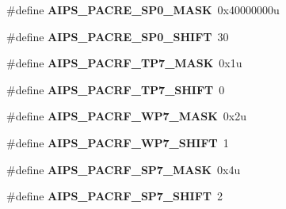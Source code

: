 \begin{DoxyCompactItemize}
\item 
\hypertarget{group___a_i_p_s___register___masks_gad466232930d5e4ed228f96fc26ead8c2}{}\#define {\bfseries A\+I\+P\+S\+\_\+\+P\+A\+C\+R\+E\+\_\+\+S\+P0\+\_\+\+M\+A\+S\+K}~0x40000000u\label{group___a_i_p_s___register___masks_gad466232930d5e4ed228f96fc26ead8c2}

\item 
\hypertarget{group___a_i_p_s___register___masks_ga47620f45a33c83729ba42d5cb7a96cd3}{}\#define {\bfseries A\+I\+P\+S\+\_\+\+P\+A\+C\+R\+E\+\_\+\+S\+P0\+\_\+\+S\+H\+I\+F\+T}~30\label{group___a_i_p_s___register___masks_ga47620f45a33c83729ba42d5cb7a96cd3}

\item 
\hypertarget{group___a_i_p_s___register___masks_ga9e5031cf93ccc20f6c807c7779884558}{}\#define {\bfseries A\+I\+P\+S\+\_\+\+P\+A\+C\+R\+F\+\_\+\+T\+P7\+\_\+\+M\+A\+S\+K}~0x1u\label{group___a_i_p_s___register___masks_ga9e5031cf93ccc20f6c807c7779884558}

\item 
\hypertarget{group___a_i_p_s___register___masks_gaf22d62e3a6d2920c5da05ba192828996}{}\#define {\bfseries A\+I\+P\+S\+\_\+\+P\+A\+C\+R\+F\+\_\+\+T\+P7\+\_\+\+S\+H\+I\+F\+T}~0\label{group___a_i_p_s___register___masks_gaf22d62e3a6d2920c5da05ba192828996}

\item 
\hypertarget{group___a_i_p_s___register___masks_ga6e87c0a628a47aed3cb92a0f589b291c}{}\#define {\bfseries A\+I\+P\+S\+\_\+\+P\+A\+C\+R\+F\+\_\+\+W\+P7\+\_\+\+M\+A\+S\+K}~0x2u\label{group___a_i_p_s___register___masks_ga6e87c0a628a47aed3cb92a0f589b291c}

\item 
\hypertarget{group___a_i_p_s___register___masks_gae53f33c892c6fe1d11ab9228298a1615}{}\#define {\bfseries A\+I\+P\+S\+\_\+\+P\+A\+C\+R\+F\+\_\+\+W\+P7\+\_\+\+S\+H\+I\+F\+T}~1\label{group___a_i_p_s___register___masks_gae53f33c892c6fe1d11ab9228298a1615}

\item 
\hypertarget{group___a_i_p_s___register___masks_gaa7e8e5b0b780abcb2a9690a9cec22364}{}\#define {\bfseries A\+I\+P\+S\+\_\+\+P\+A\+C\+R\+F\+\_\+\+S\+P7\+\_\+\+M\+A\+S\+K}~0x4u\label{group___a_i_p_s___register___masks_gaa7e8e5b0b780abcb2a9690a9cec22364}

\item 
\hypertarget{group___a_i_p_s___register___masks_ga4bb28a8a6a6faad442d6389a10ea3ca1}{}\#define {\bfseries A\+I\+P\+S\+\_\+\+P\+A\+C\+R\+F\+\_\+\+S\+P7\+\_\+\+S\+H\+I\+F\+T}~2\label{group___a_i_p_s___register___masks_ga4bb28a8a6a6faad442d6389a10ea3ca1}


\end{DoxyCompactItemize}
